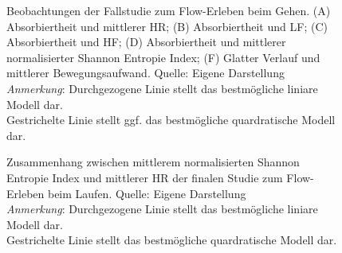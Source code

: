 \begin{figure}
	
	\caption[Beobachtungen der Fallstudie zum Flow-Erleben beim Gehen]{Beobachtungen der Fallstudie zum Flow-Erleben beim Gehen. (A) Absorbiertheit und mittlerer HR; (B) Absorbiertheit und LF; (C) Absorbiertheit und HF; (D) Absorbiertheit und mittlerer normalisierter Shannon Entropie Index; (F) Glatter Verlauf und mittlerer Bewegungsaufwand. Quelle: Eigene Darstellung \\ \hspace{\textwidth}\emph{Anmerkung}: Durchgezogene Linie stellt das bestmögliche liniare Modell dar. \\ \hspace{\textwidth}Gestrichelte Linie stellt ggf. das bestmögliche quardratische Modell dar.}
	\label{fig:B_2_regression}
\end{figure}

\begin{figure}
	
	\caption[Zusammenhang zwischen mittlerem normalisierten Shannon Entropie Index und mittlerer HR (Studie: Laufen)]{Zusammenhang zwischen mittlerem normalisierten Shannon Entropie Index und mittlerer HR der finalen Studie zum Flow-Erleben beim Laufen. Quelle: Eigene Darstellung \\ \hspace{\textwidth}\emph{Anmerkung}: Durchgezogene Linie stellt das bestmögliche liniare Modell dar. \\ \hspace{\textwidth}Gestrichelte Linie stellt das bestmögliche quardratische Modell dar.}
	\label{fig:B_3_regression_extra}
\end{figure}